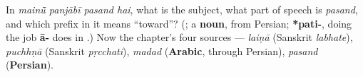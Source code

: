 \begin{tcolorbox}[breakable,colback=teal!4,colframe=teal!35!black,title={Before you move on}]
In \emph{mainū̃ panjābī pasand hai}, what is the subject, what part of speech is \emph{pasand}, and which prefix in it means “toward”? (\textbf{}; a \textbf{noun}, from Persian; \textbf{*pati-}, doing the job \textbf{ā-} does in \textbf{}.) Now the chapter's four sources — \emph{laiṇā} (Sanskrit \emph{labhate}), \emph{puchhṇā} (Sanskrit \emph{pṛcchati}), \emph{madad} (\textbf{Arabic}, through Persian), \emph{pasand} (\textbf{Persian}).
\end{tcolorbox}
